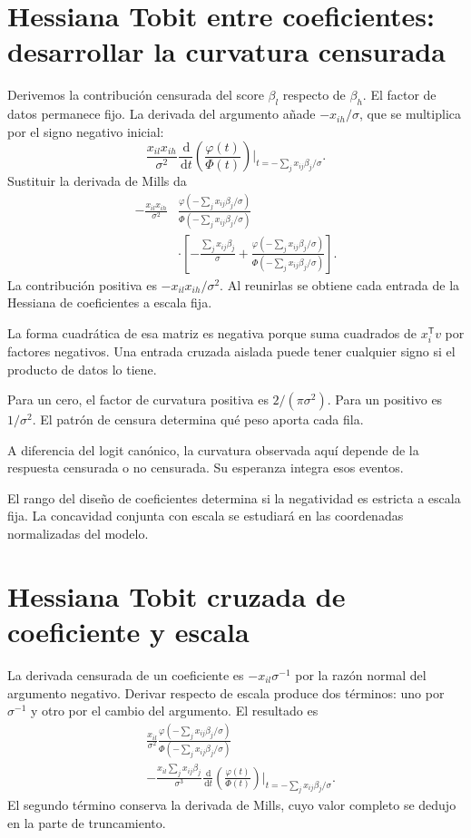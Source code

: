 \documentclass[11pt,a4paper]{article}
\newcommand{\T}{^{\mathsf T}}
\newcommand{\dd}{\,\mathrm d}
\begin{document}
\section{Hessiana Tobit entre coeficientes: desarrollar la curvatura censurada}\label{unidad95}
Derivemos la contribución censurada
del score \(\beta_l\) respecto de \(\beta_h\).
El factor de datos permanece fijo.
La derivada del argumento añade
\(-x_{ih}/\sigma\),
que se multiplica por
el signo negativo inicial:
\[
\frac{x_{il}x_{ih}}{\sigma^2}
\frac{\dd}{\dd t}
\left(\frac{\varphi(t)}{\Phi(t)}\right)
\bigg|_{t=-\sum_jx_{ij}\beta_j/\sigma}.
\]
Sustituir la derivada de Mills da
\[
\begin{aligned}
-\frac{x_{il}x_{ih}}{\sigma^2}
&\frac{\varphi(-\sum_jx_{ij}\beta_j/\sigma)}
{\Phi(-\sum_jx_{ij}\beta_j/\sigma)}\\
&\cdot\left[
-\frac{\sum_jx_{ij}\beta_j}{\sigma}
+\frac{\varphi(-\sum_jx_{ij}\beta_j/\sigma)}
{\Phi(-\sum_jx_{ij}\beta_j/\sigma)}
\right].
\end{aligned}
\]
La contribución positiva es
\(-x_{il}x_{ih}/\sigma^2\).
Al reunirlas se obtiene
cada entrada de la Hessiana
de coeficientes a escala fija.

La forma cuadrática de esa matriz
es negativa porque suma
cuadrados de \(x_i\T v\)
por factores negativos.
Una entrada cruzada aislada
puede tener cualquier signo
si el producto de datos lo tiene.

\begin{ejemplo}
Para un cero, el factor de
curvatura positiva es
\(2/(\pi\sigma^2)\).
Para un positivo es \(1/\sigma^2\).
El patrón de censura determina
qué peso aporta cada fila.
\end{ejemplo}
A diferencia del logit canónico,
la curvatura observada aquí
depende de la respuesta censurada
o no censurada.
Su esperanza integra esos eventos.

El rango del diseño de coeficientes
determina si la negatividad
es estricta a escala fija.
La concavidad conjunta con escala
se estudiará en las coordenadas
normalizadas del modelo.

\clearpage
\section{Hessiana Tobit cruzada de coeficiente y escala}\label{unidad96}
La derivada censurada de un coeficiente
es \(-x_{il}\sigma^{-1}\)
por la razón normal del argumento negativo.
Derivar respecto de escala
produce dos términos:
uno por \(\sigma^{-1}\)
y otro por el cambio del argumento.
El resultado es
\[
\begin{aligned}
&\frac{x_{il}}{\sigma^2}
\frac{\varphi(-\sum_jx_{ij}\beta_j/\sigma)}
{\Phi(-\sum_jx_{ij}\beta_j/\sigma)}\\
&-\frac{x_{il}\sum_jx_{ij}\beta_j}{\sigma^3}
\frac{\dd}{\dd t}
\left(\frac{\varphi(t)}{\Phi(t)}\right)
\bigg|_{t=-\sum_jx_{ij}\beta_j/\sigma}.
\end{aligned}
\]
El segundo término conserva
la derivada de Mills,
cuyo valor completo se
dedujo en la parte de truncamiento.
\end{document}

